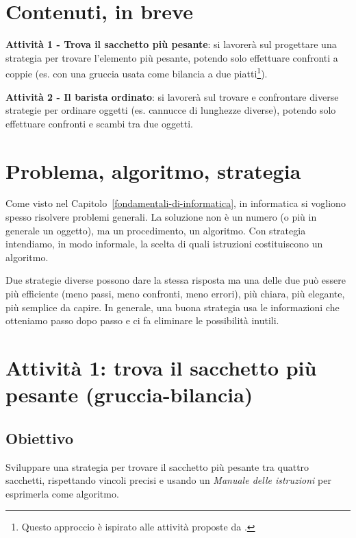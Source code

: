 \section{Contenuti, in breve }\label{contenuti-in-breve-3}

\textbf{Attività 1 - Trova il sacchetto più pesante}: si lavorerà sul progettare una strategia per trovare l'elemento più pesante, potendo solo effettuare confronti a coppie (es. con una gruccia usata come bilancia a due piatti\footnote{
  Questo approccio è ispirato alle attività proposte da \textcite{lodi-etal-2020}.
  }).

\textbf{Attività 2 - Il barista ordinato}: si lavorerà sul trovare e confrontare diverse strategie per ordinare oggetti (es. cannucce di lunghezze diverse), potendo solo effettuare confronti e scambi tra due oggetti.

\section{Problema, algoritmo, strategia }\label{problema-algoritmo-strategia}

Come visto nel Capitolo~\ref{fondamentali-di-informatica}, in informatica si vogliono spesso risolvere problemi generali. La soluzione non è un numero (o più in generale un oggetto), ma un procedimento, un algoritmo. Con strategia intendiamo, in modo informale, la scelta di quali istruzioni costituiscono un algoritmo.

Due strategie diverse possono dare la stessa risposta ma una delle due può essere più efficiente (meno passi, meno confronti, meno errori), più chiara, più elegante, più semplice da capire. In generale, una buona strategia usa le informazioni che otteniamo passo dopo passo e ci fa eliminare le possibilità inutili.

\section{Attività 1: trova il sacchetto più pesante (gruccia-bilancia)}

\ruoliattivita{\ruoloProgrammatore\quad\ruoloEsecutore}

\subsection{Obiettivo }\label{obiettivo-5}

Sviluppare una strategia per trovare il sacchetto più pesante tra quattro sacchetti, rispettando vincoli precisi e usando un \emph{Manuale delle istruzioni} per esprimerla come algoritmo.

